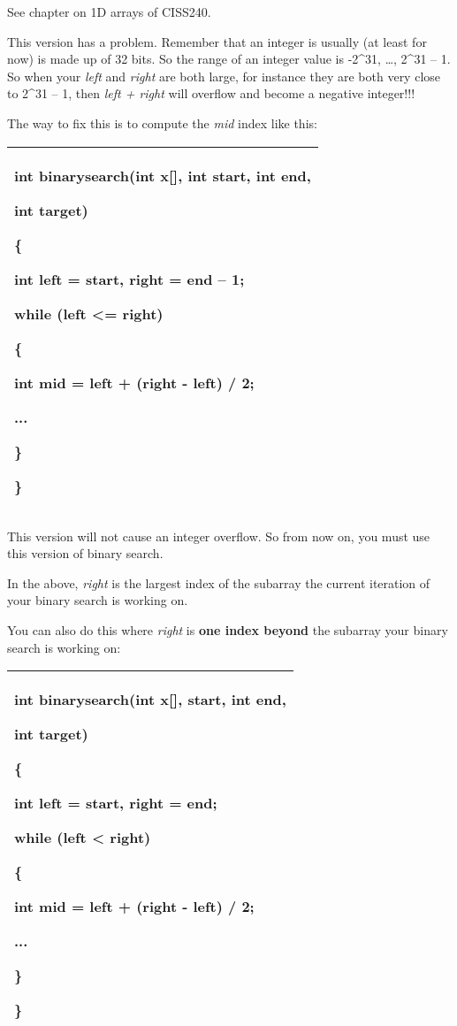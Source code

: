 \documentclass[
]{article}
\begin{document}
See chapter on 1D arrays of CISS240.

This version has a problem. Remember that an integer is usually (at
least for now) is made up of 32 bits. So the range of an integer value
is -2\^{}31, \ldots, 2\^{}31 -- 1. So when your \emph{left} and
\emph{right} are both large, for instance they are both very close to
2\^{}31 -- 1, then \emph{left + right} will overflow and become a
negative integer!!!

The way to fix this is to compute the \emph{mid} index like this:

\begin{longtable}[]{@{}l@{}}
\toprule
\endhead
\begin{minipage}[t]{0.97\columnwidth}\raggedright
int binarysearch(int x{[}{]}, int start, int end,

int target)

\{

int left = start, right = end -- 1;

while (left \textless= right)

\{

int mid = \textbf{left + (right - left) / 2;}

...

\}

\}\strut
\end{minipage}\tabularnewline
\bottomrule
\end{longtable}

This version will not cause an integer overflow. So from now on, you
must use this version of binary search.

In the above, \emph{right} is the largest index of the subarray the
current iteration of your binary search is working on.

You can also do this where \emph{right} is \textbf{one index beyond} the
subarray your binary search is working on:

\begin{longtable}[]{@{}l@{}}
\toprule
\endhead
\begin{minipage}[t]{0.97\columnwidth}\raggedright
int binarysearch(int x{[}{]}, start, int end,

int target)

\{

int left = start, right = \textbf{end};

while (left \textbf{\textless{}} right)

\{

int mid = left + (right - left) / 2;

...

\}

\}\strut
\end{minipage}\tabularnewline
\bottomrule
\end{longtable}
\end{document}
